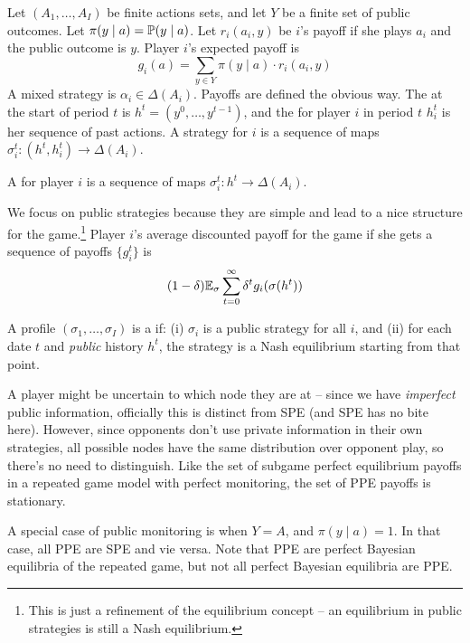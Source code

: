 \documentclass[10pt]{article}
\begin{document}
\begin{model}
	Let $(A_1,\dots,A_I)$ be finite actions sets, and let $Y$ be a finite set of public outcomes. Let $\pi(y\mid a) = \mathbb{P}(y\mid a)$. Let $r_i(a_i,y)$ be $i$'s payoff if she plays $a_i$ and the public outcome is $y$. Player $i$'s expected payoff is \[g_i(a) = \sum_{y\in Y} \pi(y\mid a) \cdot r_i(a_i,y)\]A mixed strategy is $\alpha_i \in \Delta(A_i)$. Payoffs are defined the obvious way. The  at the start of period $t$ is $h^t = (y^0,\dots,y^{t-1})$, and the  for player $i$ in period $t$ $h_i^t$ is her sequence of past actions. A strategy for $i$ is a sequence of maps $\sigma_i^t: (h^t,h^t_i) \to \Delta(A_i)$. 
	
	\begin{definition}
		A  for player $i$ is a sequence of maps $\sigma^t_i:h^t \to \Delta(A_i)$. 
	\end{definition}
	We focus on public strategies because they are simple and lead to a nice structure for the game.\footnote{This is just a refinement of the equilibrium concept -- an equilibrium in public strategies is still a Nash equilibrium.} Player $i$'s average discounted payoff for the game if she gets a sequence of payoffs $\{g_i^t\}$ is \[(1-\delta) \mathbb{E}_\sigma \sum_{t=0}^\infty \delta^t g_i(\sigma(h^t))\]
	
	\begin{definition}
		A profile $(\sigma_1,\dots,\sigma_I)$ is a  if: (i) $\sigma_i$ is a public strategy for all $i$, and (ii) for each date $t$ and \emph{public} history $h^t$, the strategy is a Nash equilibrium starting from that point.
	\end{definition}
	\begin{remark}
		A player might be uncertain to which node they are at -- since we have \emph{imperfect} public information, officially this is distinct from SPE (and SPE has no bite here). However, since opponents don't use private information in their own strategies, all possible nodes have the same distribution over opponent play, so there's no need to distinguish. Like the set of subgame perfect equilibrium payoffs in a repeated game model with perfect monitoring, the set of PPE payoffs is stationary.
	\end{remark}
\end{model}

A special case of public monitoring is when $Y=A$, and $\pi(y \mid a) = 1$. In that case, all PPE are SPE and vie versa. Note that PPE are perfect Bayesian equilibria of the repeated game, but not all perfect Bayesian equilibria are PPE.
\end{document}
